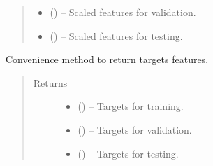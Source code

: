 \documentclass[letterpaper,10pt,english]{sphinxmanual}
\begin{document}
\begin{fulllineitems}
\begin{fulllineitems}
\begin{quote}
\begin{description}
\begin{itemize}
\item {} 
 () -- Scaled features for validation.

\item {} 
 () -- Scaled features for testing.

\end{itemize}


\end{description}\end{quote}

\end{fulllineitems}


\begin{fulllineitems}
\label{\detokenize{api/ucf.TrainingDataSets:ucf.TrainingDataSets.get_targets}}
Convenience method to return targets features.
\begin{quote}\begin{description}
\item[{Returns}] \leavevmode
\begin{itemize}
\item {} 
 () -- Targets for training.

\item {} 
 () -- Targets for validation.

\item {} 
 () -- Targets for testing.

\end{itemize}


\end{description}\end{quote}

\end{fulllineitems}



\end{fulllineitems}
\end{document}
